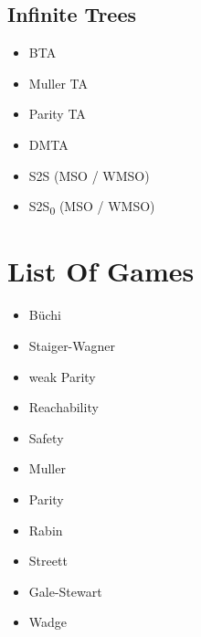 \documentclass{article}
\begin{document}
\subsection{Infinite Trees}
\begin{itemize}
	\item BTA
	\item Muller TA
	\item Parity TA
	\item DMTA
	\item S2S (MSO / WMSO)
	\item S2S\textsubscript{0} (MSO / WMSO)
\end{itemize}

\section{List Of Games}
\begin{itemize}
	\item Büchi
	\item Staiger-Wagner
	\item weak Parity
	\item Reachability
	\item Safety
	\item Muller
	\item Parity
	\item Rabin
	\item Streett
	\item Gale-Stewart
	\item Wadge
\end{itemize}

\newpage
\end{document}
